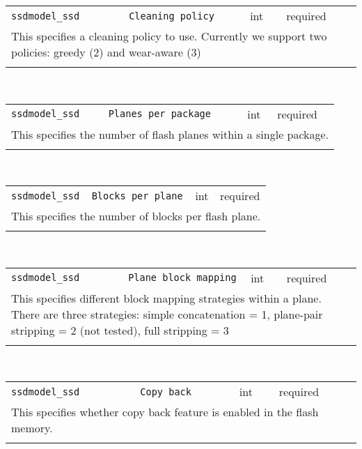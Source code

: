 \noindent 
\begin{tabular}{|p{\lpmodwidth}|p{\lpnamewidth}|p{0.5in}|p{0.5in}|}
\cline{1-4}
\texttt{ssdmodel\_ssd} & \texttt{Cleaning policy} & int & required \\ 
\cline{1-4}
\multicolumn{4}{|p{6in}|}{
This specifies a cleaning policy to use. Currently we support
two policies: greedy (2) and wear-aware (3)
}\\ 
\cline{1-4}
\multicolumn{4}{p{5in}}{}\\
\end{tabular}\\ 
\noindent 
\begin{tabular}{|p{\lpmodwidth}|p{\lpnamewidth}|p{0.5in}|p{0.5in}|}
\cline{1-4}
\texttt{ssdmodel\_ssd} & \texttt{Planes per package} & int & required \\ 
\cline{1-4}
\multicolumn{4}{|p{6in}|}{
This specifies the number of flash planes within a single package.
}\\ 
\cline{1-4}
\multicolumn{4}{p{5in}}{}\\
\end{tabular}\\ 
\noindent 
\begin{tabular}{|p{\lpmodwidth}|p{\lpnamewidth}|p{0.5in}|p{0.5in}|}
\cline{1-4}
\texttt{ssdmodel\_ssd} & \texttt{Blocks per plane} & int & required \\ 
\cline{1-4}
\multicolumn{4}{|p{6in}|}{
This specifies the number of blocks per flash plane.
}\\ 
\cline{1-4}
\multicolumn{4}{p{5in}}{}\\
\end{tabular}\\ 
\noindent 
\begin{tabular}{|p{\lpmodwidth}|p{\lpnamewidth}|p{0.5in}|p{0.5in}|}
\cline{1-4}
\texttt{ssdmodel\_ssd} & \texttt{Plane block mapping} & int & required \\ 
\cline{1-4}
\multicolumn{4}{|p{6in}|}{
This specifies different block mapping strategies within a plane.
There are three strategies: simple concatenation = 1,
plane-pair stripping = 2 (not tested), full stripping = 3
}\\ 
\cline{1-4}
\multicolumn{4}{p{5in}}{}\\
\end{tabular}\\ 
\noindent 
\begin{tabular}{|p{\lpmodwidth}|p{\lpnamewidth}|p{0.5in}|p{0.5in}|}
\cline{1-4}
\texttt{ssdmodel\_ssd} & \texttt{Copy back} & int & required \\ 
\cline{1-4}
\multicolumn{4}{|p{6in}|}{
This specifies whether copy back feature is enabled in the flash memory.
}\\ 
\cline{1-4}
\multicolumn{4}{p{5in}}{}\\
\end{tabular}\\ 
